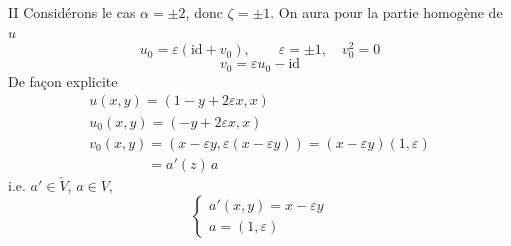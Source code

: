 \documentclass[11pt,a4paper]{article}
\begin{document}
II Considérons le cas $\alpha = \pm 2$, donc $\zeta = \pm 1$. On aura pour la partie homogène  de $u$
\[
u_0 = \varepsilon(\mathrm{id} + v_0), \qquad \varepsilon = \pm 1, \quad v_0^2 = 0
\]
\[
v_0 = \varepsilon u_0 - \mathrm{id}
\]
De façon explicite
\[
\begin{array}{l}
u(x,y) = (1 - y + 2\varepsilon x, x) \\
u_0(x,y) = (-y + 2\varepsilon x, x) \\
v_0(x,y) = (x - \varepsilon y, \varepsilon(x - \varepsilon y)) = (x - \varepsilon y)(1, \varepsilon) \\
\phantom{v_0(x,y)} = a'(z)\, a
\end{array}
\]
i.e. \struck{\ill{}} $a' \in \check{V}$, $a \in V$,
\[
\begin{cases}
a'(x,y) = x - \varepsilon y \\
a = (1, \varepsilon)
\end{cases}
\]
\end{document}
